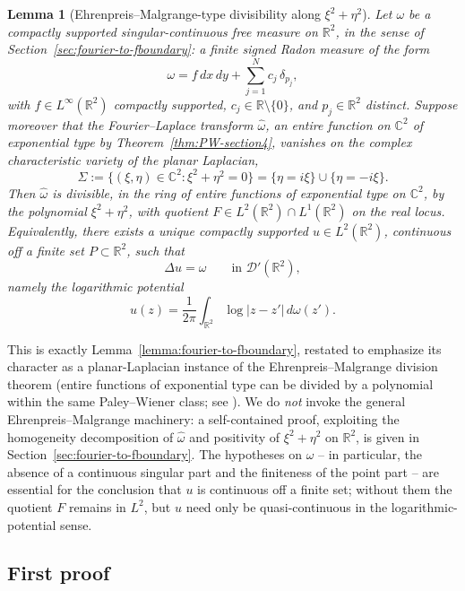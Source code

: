 \documentclass[a4paper,11pt,reqno]{amsart}
\numberwithin{equation}{section}
\theoremstyle{plain} %
\newtheorem{lemma}{Lemma}[section]
\theoremstyle{definition} %
\theoremstyle{remark}
\newcommand{\R}{\mathbb{R}}
\newcommand{\C}{\mathbb{C}}
\begin{document}
\begin{lemma}[Ehrenpreis--Malgrange-type divisibility along $\xi^2+\eta^2$]\label{lem:EM-section4}
Let $\omega$ be a compactly supported singular-continuous free measure on
$\R^2$, in the sense of Section~\ref{sec:fourier-to-fboundary}: a finite
signed Radon measure of the form
\[
\omega=f\,dx\,dy+\sum_{j=1}^N c_j\,\delta_{p_j},
\]
with $f\in L^\infty(\R^2)$ compactly supported, $c_j\in\R\setminus\{0\}$,
and $p_j\in\R^2$ distinct. Suppose moreover that the Fourier--Laplace
transform $\widehat\omega$, an entire function on $\C^2$ of exponential
type by Theorem~\ref{thm:PW-section4}, vanishes on the complex
characteristic variety of the planar Laplacian,
\begin{equation}\label{eq:complex-char-variety}
\Sigma:=\{(\xi,\eta)\in\C^2:\xi^2+\eta^2=0\}=\{\eta=i\xi\}\cup\{\eta=-i\xi\}.
\end{equation}
Then $\widehat\omega$ is divisible, in the ring of entire functions of
exponential type on $\C^2$, by the polynomial $\xi^2+\eta^2$, with quotient
$F\in L^2(\R^2)\cap L^1(\R^2)$ on the real locus. Equivalently, there
exists a unique compactly supported $u\in L^2(\R^2)$, continuous off a
finite set $P\subset\R^2$, such that
\[
\Delta u=\omega\qquad\text{in }\mathcal D'(\R^2),
\]
namely the logarithmic potential
\[
u(z)=\frac{1}{2\pi}\int_{\R^2}\log|z-z'|\,d\omega(z').
\]
\end{lemma}

This is exactly Lemma~\ref{lemma:fourier-to-fboundary}, restated to
emphasize its character as a planar-Laplacian instance of the
Ehrenpreis--Malgrange division theorem (entire functions of exponential
type can be divided by a polynomial within the same Paley--Wiener class;
see \cite[Ch.~7]{Hormander-PDE1}). We do \emph{not} invoke the general
Ehrenpreis--Malgrange machinery: a self-contained proof, exploiting the
homogeneity decomposition of $\widehat\omega$ and positivity of
$\xi^2+\eta^2$ on $\R^2$, is given in Section~\ref{sec:fourier-to-fboundary}.
The hypotheses on $\omega$ -- in particular, the absence of a continuous
singular part and the finiteness of the point part -- are essential for
the conclusion that $u$ is continuous off a finite set; without them the
quotient $F$ remains in $L^2$, but $u$ need only be quasi-continuous in
the logarithmic-potential sense.

\subsection{First proof}
\end{document}
